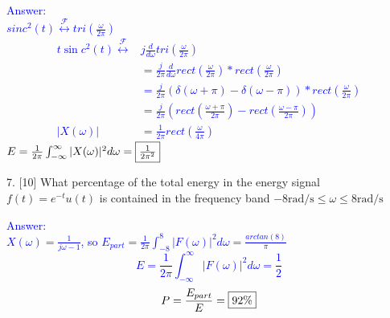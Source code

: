 \documentclass[12pt,a4paper]{article}
\begin{document}
\begin{tcolorbox}
\normalsize
\textcolor{blue}{Answer:\\
$sinc^2(t)\stackrel{\mathcal{F}}{\longleftrightarrow}tri(\frac{\omega}{2\pi})$\\
$$
\begin{aligned}
t \sin c^{2}(t) \stackrel{\mathcal{F}}{\longleftrightarrow} & j \frac{d}{d \omega} {tri}\left(\frac{\omega}{2 \pi}\right) \\
&=\frac{j}{2 \pi} \frac{d}{d \omega} {rect}\left(\frac{\omega}{2 \pi}\right) * {rect}\left(\frac{\omega}{2 \pi}\right) \\
&=\frac{j}{2 \pi}(\delta(\omega+\pi)-\delta(\omega-\pi)) * {rect}\left(\frac{\omega}{2 \pi}\right) \\
&=\frac{j}{2 \pi}\left({rect}\left(\frac{\omega+\pi}{2 \pi}\right)-{rect}\left(\frac{\omega-\pi}{2 \pi}\right)\right) \\
|X(\omega)| &=\frac{1}{2 \pi} {rect}\left(\frac{\omega}{4 \pi}\right)
\end{aligned}
$$
$E=\frac{1}{2\pi}\int_{-\infty}^\infty|X(\omega)|^2d\omega=\fbox{$\frac{1}{2\pi^2}$}$
}
\end{tcolorbox}

\begin{tcolorbox}[colback = white]
7. [10] What percentage of the total energy in the energy signal $f(t)=e^{-t} u(t)$ is contained in the frequency band $-8 \mathrm{rad} / \mathrm{s} \leq \omega \leq 8 \mathrm{rad} / \mathrm{s}$
\end{tcolorbox}
\begin{tcolorbox}
\normalsize
\textcolor{blue}{Answer:\\
$X(\omega)=\frac{1}{j\omega-1}$, so $E_{part}=\frac{1}{2\pi}\int_{-8}^8|F(\omega)|^2d\omega=\frac{arctan(8)}{\pi}$\\
$$E=\frac{1}{2\pi}\int_{-\infty}^\infty|F(\omega)|^2d\omega=\frac{1}{2}$$
$$P=\frac{E_{part}}{E}=\fbox{92\%}$$
}
\end{tcolorbox}
\end{document}
